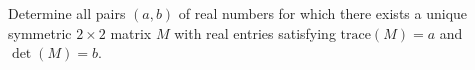 \documentclass{article}
\begin{document}
\setlength{\parindent}{0pt}
Determine all pairs $(a, b)$ of real numbers for which there exists a unique symmetric $2 \times 2$ matrix $M$ with real entries satisfying $\text{trace}(M) = a$ and $\det(M) = b$.
\end{document}
